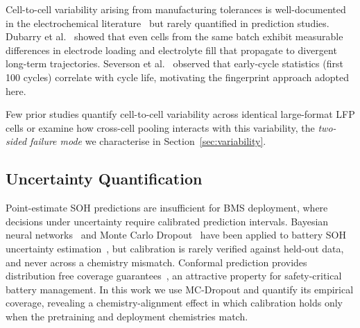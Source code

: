 Cell-to-cell variability arising from manufacturing tolerances is
well-documented in the electrochemical literature~\cite{birkl2017degradation}
but rarely quantified in prediction studies.
Dubarry et al.~\cite{dubarry2018synthesize} showed that even cells from
the same batch exhibit measurable differences in electrode loading and
electrolyte fill that propagate to divergent long-term trajectories.
Severson et al.~\cite{severson2019data} observed that early-cycle
statistics (first 100 cycles) correlate with cycle life, motivating
the fingerprint approach adopted here.

Few prior studies quantify cell-to-cell variability across identical
large-format LFP cells or examine how cross-cell pooling interacts with
this variability,
the \textit{two-sided failure mode} we characterise in Section~\ref{sec:variability}.

\subsection{Uncertainty Quantification}

Point-estimate SOH predictions are insufficient for BMS deployment, where
decisions under uncertainty require calibrated prediction intervals.
Bayesian neural networks~\cite{blundell2015weight} and Monte Carlo
Dropout~\cite{gal2016dropout} have been applied to battery SOH uncertainty
estimation~\cite{ke2024bayesian}, but calibration is rarely verified against
held-out data, and never across a chemistry mismatch.
Conformal prediction provides distribution free coverage
guarantees~\cite{angelopoulos2021gentle}, an attractive property for
safety-critical battery management.
In this work we use MC-Dropout and quantify its empirical coverage, revealing
a chemistry-alignment effect in which calibration holds only when the
pretraining and deployment chemistries match.
